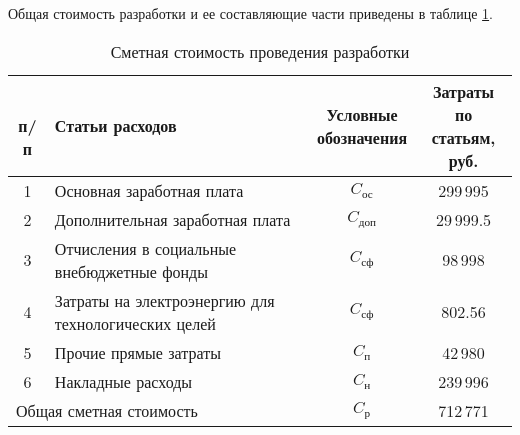 Общая стоимость разработки и ее составляющие части приведены в таблице \ref{cost_total}.

\begin{table}[h!]
	\caption{Сметная стоимость проведения разработки}
	\label{cost_total}
	\begin{tabular}{|c|p{9cm}|c|c|}
		\hline
			\thead{\No \\ п/п} & Статьи расходов & \thead{Условные\\обозначения} & \thead{Затраты по\\ статьям, руб.}\\
		\hline
			1 & Основная заработная плата & $C_\textit{ос}$ & 299\,995 \\
		\hline
			2 & Дополнительная заработная плата & $C_\textit{доп}$ & 29\,999.5 \\
		\hline
			3 & Отчисления в социальные внебюджетные фонды & $C_\textit{сф}$ & 98\,998 \\
		\hline
			4 & Затраты на электроэнергию для технологических целей  & $C_\textit{сф}$ & 802.56 \\
		\hline
			5 & Прочие прямые затраты & $C_\textit{п}$ & 42\,980 \\
		\hline		
			6 & Накладные расходы & $C_\textit{н}$ & 239\,996 \\
		\hline		
			\multicolumn{2}{|l|}{Общая сметная стоимость} & $C_\textit{р}$ & 712\,771 \\
		\hline
	\end{tabular}
\end{table}